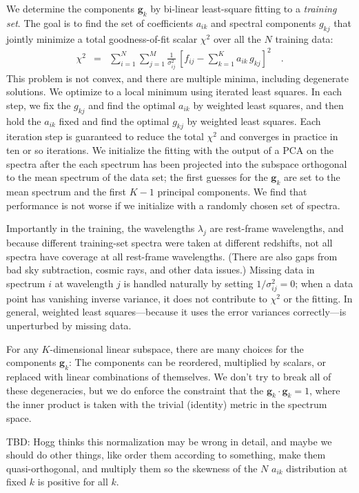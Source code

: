 \documentclass[preprint]{aastex}
\newcommand{\mmatrix}[1]{\boldsymbol{#1}}
\newcommand{\gvec}{\mmatrix{g}}
\begin{document}
We determine the components $\gvec_k$ by bi-linear least-square
fitting to a \emph{training set}.  The goal is to find the set of
coefficients $a_{ik}$ and spectral components $g_{kj}$ that jointly
minimize a total goodness-of-fit scalar $\chi^2$ over all the $N$
training data:
\begin{eqnarray}\displaystyle
\chi^2 &=& \sum_{i=1}^N \sum_{j=1}^M \frac{1}{\sigma^2_{ij}}
 \,\left[f_{ij} - \sum_{k=1}^K a_{ik}\,g_{kj}\right]^2
\quad .
\end{eqnarray}
This problem is not convex, and there are multiple minima, including
degenerate solutions.  We optimize to a local minimum using iterated
least squares.  In each step, we fix the $g_{kj}$ and find the optimal
$a_{ik}$ by weighted least squares, and then hold the $a_{ik}$ fixed
and find the optimal $g_{kj}$ by weighted least squares.  Each
iteration step is guaranteed to reduce the total $\chi^2$ and
converges in practice in ten or so iterations.  We initialize the
fitting with the output of a PCA on the spectra after the each
spectrum has been projected into the subspace orthogonal to the mean
spectrum of the data set; the first guesses for the $\gvec_k$ are set
to the mean spectrum and the first $K-1$ principal components.  We
find that performance is not worse if we initialize with a randomly
chosen set of spectra.

Importantly in the training, the wavelengths $\lambda_j$ are
rest-frame wavelengths, and because different training-set spectra
were taken at different redshifts, not all spectra have coverage at
all rest-frame wavelengths.  (There are also gaps from bad sky
subtraction, cosmic rays, and other data issues.)  Missing data in
spectrum $i$ at wavelength $j$ is handled naturally by setting
$1/\sigma^2_{ij}=0$; when a data point has vanishing inverse
variance, it does not contribute to $\chi^2$ or the fitting.  In
general, weighted least squares---because it uses the error variances
correctly---is unperturbed by missing data.

For any $K$-dimensional linear subspace, there are many choices for
the components $\gvec_k$: The components can be reordered, multiplied
by scalars, or replaced with linear combinations of themselves.  We
don't try to break all of these degeneracies, but we do enforce the
constraint that the $\gvec_k\cdot\gvec_k=1$, where the inner product
is taken with the trivial (identity) metric in the spectrum space.

TBD: Hogg thinks this normalization may be wrong in detail, and maybe
we should do other things, like order them according to something,
make them quasi-orthogonal, and multiply them so the skewness of the
$N$ $a_{ik}$ distribution at fixed $k$ is positive for all $k$.
\end{document}
